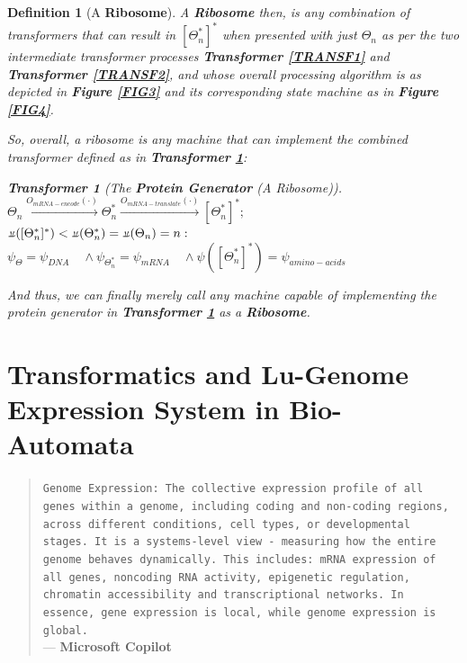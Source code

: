 \documentclass[a4paper, 18pt]{book} %
\newtheorem{defn}{Definition}
\newtheorem{transf}{Transformer}
\newcommand{\invpi}{\rotatebox[origin=c]{180}{$\pi$}}
\begin{document}
\begin{defn}[A \textbf{Ribosome}]
A \textbf{Ribosome} then, is any combination of transformers that can result in $[\Theta^*_n]^*$ when presented with just $\Theta_n$ as per the two intermediate transformer processes \textbf{Transformer \ref{TRANSF1}} and \textbf{Transformer \ref{TRANSF2}}, and whose overall processing algorithm is as depicted in \textbf{Figure \ref{FIG3}} and its corresponding state machine as in \textbf{Figure \ref{FIG4}}. 

So, overall, a ribosome is any machine that can implement the combined transformer defined as in \textbf{Transformer \ref{TRANSF3}}:

\begin{transf}[The \textbf{Protein Generator} (A Ribosome)]
\label{TRANSF3}
$\Theta_n  \xrightarrow{O_{mRNA-encode}(\cdot)}  \Theta^*_n  \xrightarrow{O_{mRNA-translate}(\cdot)} [\Theta^*_n]^*;$\\
$\invpi([\Theta^*_n]^*) < \invpi(\Theta^*_n) = \invpi(\Theta_n) = n:$\\
$\psi_{\Theta} = \psi_{DNA} \quad \land \psi_{\Theta^*_n} = \psi_{mRNA} \quad \land \psi([\Theta^*_n]^*) = \psi_{amino-acids}$
\end{transf}

And thus, we can finally merely call any machine capable of implementing the protein generator  in \textbf{Transformer \ref{TRANSF3}} as a \textbf{Ribosome}.

\end{defn}


\chapter{Transformatics and Lu-Genome Expression System in Bio-Automata}
\label{SEC4}

\begin{quotation}
\noindent \texttt{Genome Expression: The collective expression profile of all genes within a genome, including coding and non-coding regions, across different conditions, cell types, or developmental stages. It is a systems-level view - measuring how the entire genome behaves dynamically. This includes: mRNA expression of all genes, noncoding RNA activity, epigenetic regulation, chromatin accessibility and transcriptional networks. In essence, gene expression is local, while genome expression is global.}\\
\hspace*{\fill} --- \textbf{Microsoft Copilot}\cite{copilot_dna_assistant}
\end{quotation}
\end{document}
